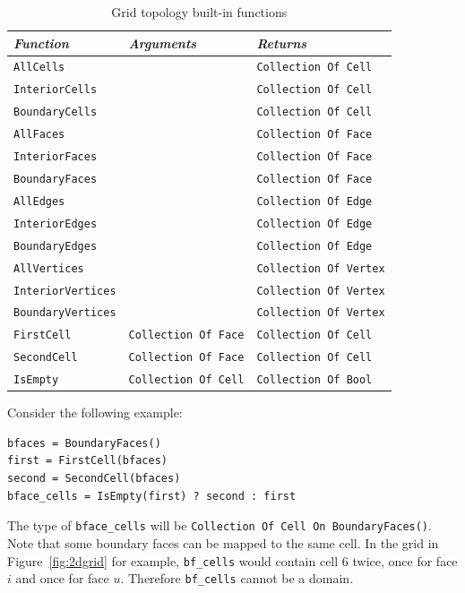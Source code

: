 \documentclass[11pt]{article}
\newcommand{\code}[1]{\texttt{#1}}
\begin{document}
\begin{table}
\begin{tabular}{l|l|l}
{\em Function} & {\em Arguments} & {\em Returns} \\
\hline
\code{AllCells} & & \code{Collection Of Cell} \\
\code{InteriorCells} & & \code{Collection Of Cell} \\
\code{BoundaryCells} & & \code{Collection Of Cell} \\
\code{AllFaces} & & \code{Collection Of Face} \\
\code{InteriorFaces} & & \code{Collection Of Face} \\
\code{BoundaryFaces} & & \code{Collection Of Face} \\
\code{AllEdges} & & \code{Collection Of Edge} \\
\code{InteriorEdges} & & \code{Collection Of Edge} \\
\code{BoundaryEdges} & & \code{Collection Of Edge} \\
\code{AllVertices} & & \code{Collection Of Vertex} \\
\code{InteriorVertices} & & \code{Collection Of Vertex} \\
\code{BoundaryVertices} & & \code{Collection Of Vertex} \\
\code{FirstCell} & \code{Collection Of Face} & \code{Collection Of Cell}  \\
\code{SecondCell} & \code{Collection Of Face} & \code{Collection Of Cell}  \\
\code{IsEmpty} & \code{Collection Of Cell} & \code{Collection Of Bool}  \\
\end{tabular}
\caption{Grid topology built-in functions}
\label{tab:topfunc}
\end{table}

Consider the following example:

\begin{verbatim}
bfaces = BoundaryFaces()
first = FirstCell(bfaces)
second = SecondCell(bfaces)
bface_cells = IsEmpty(first) ? second : first
\end{verbatim}

The type of \code{bface\_cells} will be \code{Collection Of Cell On BoundaryFaces()}. Note
that some boundary faces can be mapped to the same cell. In the grid in
Figure~\ref{fig:2dgrid} for example, \code{bf\_cells} would contain cell $6$ twice, once for
face $i$ and once for face $u$. Therefore \code{bf\_cells} cannot be a domain.
\end{document}
